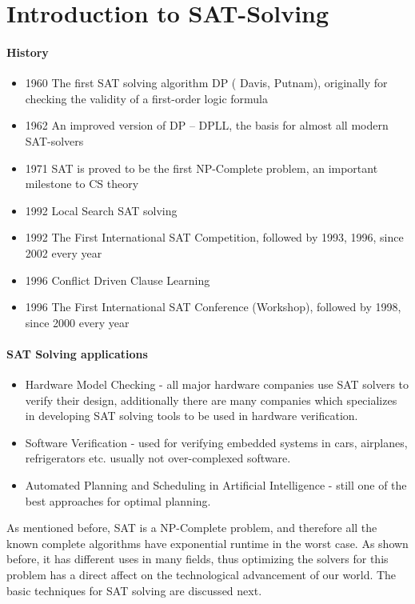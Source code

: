 \documentclass[]{article}
\begin{document}
	\section{Introduction to SAT-Solving}
	\paragraph{History}
	\begin{itemize}
		\item 1960 The first SAT solving algorithm DP ( Davis, Putnam), originally for checking the validity of a first-order logic formula
		\item 1962 An improved version of DP – DPLL, the basis for almost all modern SAT-solvers
		\item 1971 SAT is proved to be the first NP-Complete problem, an important milestone to CS theory
		\item 1992 Local Search SAT solving
		\item 1992 The First International SAT Competition, followed by 1993, 1996, since 2002 every year
		\item 1996 Conflict Driven Clause Learning
		\item 1996 The First International SAT Conference (Workshop), followed by 1998, since 2000 every year
	\end{itemize}
	
	\paragraph{SAT Solving applications}
	\begin{itemize}
		\item Hardware Model Checking - all major hardware companies use SAT solvers to verify their design, additionally there are many companies which specializes in developing SAT solving tools to be used in hardware verification.
		\item Software Verification - used for verifying embedded systems in cars, airplanes, refrigerators etc. usually not over-complexed software.
		\item Automated Planning and Scheduling in Artificial Intelligence - still one of the best approaches for optimal planning.
	\end{itemize}
	
	As mentioned before, SAT is a NP-Complete problem, and therefore all the known complete algorithms have exponential runtime in the worst case. As shown before, it has different uses in many fields, thus optimizing the solvers for this problem has a direct affect on the technological advancement of our world. The basic techniques for SAT solving are discussed next.
\end{document}
